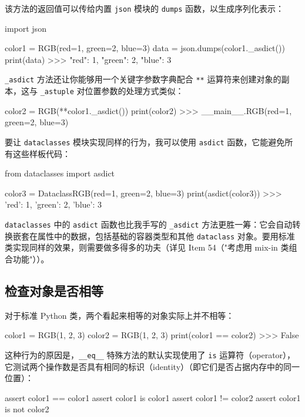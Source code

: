该方法的返回值可以传给内置 \texttt{json} 模块的 \texttt{dumps} 函数，以生成序列化表示：

\begin{codebox}[python]
import json

color1 = RGB(red=1, green=2, blue=3)
data = json.dumps(color1._asdict())
print(data)
>>>
{"red": 1, "green": 2, "blue": 3}
\end{codebox}

\texttt{\_asdict} 方法还让你能够用一个关键字参数字典配合 \texttt{**} 运算符来创建对象的副本，这与 \texttt{\_astuple} 对位置参数的处理方式类似：

\begin{codebox}[python]
color2 = RGB(**color1._asdict())
print(color2)
>>>
__main__.RGB(red=1, green=2, blue=3)
\end{codebox}

要让 \texttt{dataclasses} 模块实现同样的行为，我可以使用 \texttt{asdict} 函数，它能避免所有这些样板代码：

\begin{codebox}[python]
from dataclasses import asdict

color3 = DataclassRGB(red=1, green=2, blue=3)
print(asdict(color3))
>>>
{'red': 1, 'green': 2, 'blue': 3}
\end{codebox}

\texttt{dataclasses} 中的 \texttt{asdict} 函数也比我手写的 \texttt{\_asdict} 方法更胜一筹：它会自动转换嵌套在属性中的数据，包括基础的容器类型和其他 \texttt{dataclass} 对象。要用标准类实现同样的效果，则需要做多得多的功夫（详见 Item 54（"考虑用 mix-in 类组合功能"））。

\subsection{检查对象是否相等}

对于标准 Python 类，两个看起来相等的对象实际上并不相等：

\begin{codebox}[python]
color1 = RGB(1, 2, 3)
color2 = RGB(1, 2, 3)
print(color1 == color2)
>>>
False
\end{codebox}

这种行为的原因是，\texttt{\_\_eq\_\_} 特殊方法的默认实现使用了 \texttt{is} 运算符（operator），它测试两个操作数是否具有相同的标识（identity）（即它们是否占据内存中的同一位置）：

\begin{codebox}[python]
assert color1 == color1
assert color1 is color1
assert color1 != color2
assert color1 is not color2
\end{codebox}


